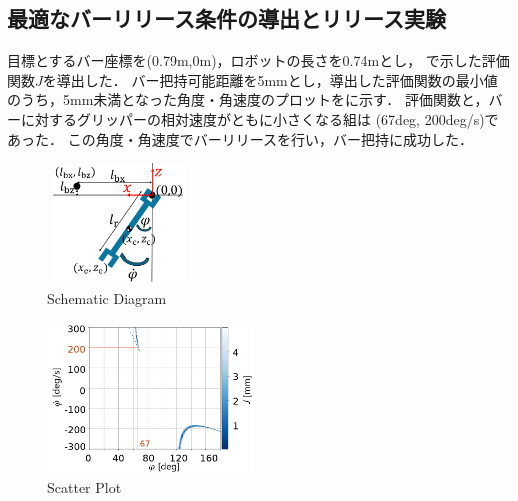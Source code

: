 \begin{small}
\section{最適なバーリリース条件の導出とリリース実験}
\vspace{-2mm}
目標とするバー座標を(0.79m,0m)，ロボットの長さを0.74mとし，
で示した評価関数$J$を導出した．
バー把持可能距離を5mmとし，導出した評価関数の最小値のうち，5mm未満となった角度・角速度のプロットをに示す．
評価関数と，バーに対するグリッパーの相対速度がともに小さくなる組は
(67deg, 200deg/s)であった．
この角度・角速度でバーリリースを行い，バー把持に成功した．
\begin{figure}[t]
    \begin{center}
    \includegraphics[width=38mm,height=32mm]{./fig/bar-robot6.png}
    \vspace{-5mm}
    \caption{Schematic Diagram}
    \vspace{-3mm}
    \end{center}
    \end{figure}
\begin{figure}[t]
    \begin{center}
    \includegraphics[width=55mm,height=40mm]{./fig/2Dver6_4.png}
    \vspace{-6mm}
    \caption{Scatter Plot}
    \vspace{-7.5mm}
    \end{center}
    \end{figure}
\vspace{-2.8mm}

\end{small}
